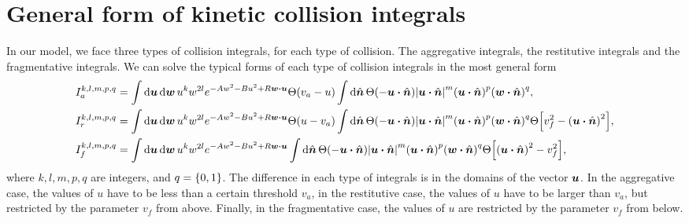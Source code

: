\documentclass[aps,prl,preprint,groupedaddress,10pt]{revtex4-2}
\begin{document}
\section{General form of kinetic collision integrals}
In our model, we face three types of collision integrals, for each type of collision.
The aggregative integrals, the restitutive integrals and the fragmentative integrals.
We can solve the typical forms of each type of collision integrals in the most general form
\begin{equation}
    \begin{split}
        I_a^{k,l,m,p,q} &= \int\dd{\bu}\dd{\bw}u^kw^{2l}
        e^{-Aw^2-Bu^2+R\bw\vdot\bu}\Theta\pqty{v_a-u}
        \int\dd{\bn}\Theta\pqty{-\bu\vdot\bn}\abs{\bu\vdot\bn}^m
        \pqty{\bu\vdot\bn}^p\pqty{\bw\vdot\bn}^q,\\
        I_r^{k,l,m,p,q} &= \int\dd{\bu}\dd{\bw}u^kw^{2l}
        e^{-Aw^2-Bu^2+R\bw\vdot\bu}\Theta\pqty{u-v_a}
        \int\dd{\bn}\Theta\pqty{-\bu\vdot\bn}\abs{\bu\vdot\bn}^m
        \pqty{\bu\vdot\bn}^p\pqty{\bw\vdot\bn}^q
        \Theta\bqty{v_f^2-\pqty{\bu\vdot\bn}^2},\\
        I_f^{k,l,m,p,q} &= \int\dd{\bu}\dd{\bw}u^kw^{2l}
        e^{-Aw^2-Bu^2+R\bw\vdot\bu}
        \int\dd{\bn}\Theta\pqty{-\bu\vdot\bn}\abs{\bu\vdot\bn}^m
        \pqty{\bu\vdot\bn}^p\pqty{\bw\vdot\bn}^q
        \Theta\bqty{\pqty{\bu\vdot\bn}^2-v_f^2},\\
    \end{split}
\end{equation}
where $k,l,m,p,q$ are integers, and $q=\Bqty{0,1}$. The difference in each type of
integrals is in the domains of the vector $\vb*{u}$. In the aggregative case, the values of
$u$ have to be less than a certain threshold $v_a$, in the restitutive case, the
values of $u$ have to be larger than $v_a$, but restricted by the parameter
$v_f$ from above. Finally, in the fragmentative case, the values of $u$ are restricted
by the parameter $v_f$ from below.
\end{document}
